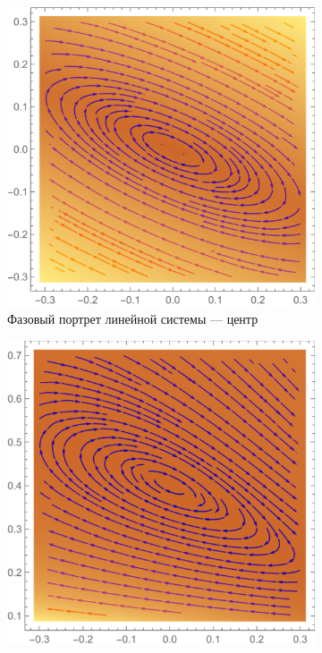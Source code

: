 \documentclass[12pt, a4paper]{article}
\begin{document}
\begin{enumerate}
\begin{figure}[H]
\begin{subfigure}[H]{0.4\textwidth}
		\includegraphics[width=\textwidth]{p6}
		\caption{Фазовый портрет линейной системы --- центр}
	\end{subfigure}
	\qquad\qquad
	\begin{subfigure}[H]{0.4\textwidth}
		\includegraphics[width=\textwidth]{p66}

\end{subfigure}
\end{figure}
\end{enumerate}
\end{document}
